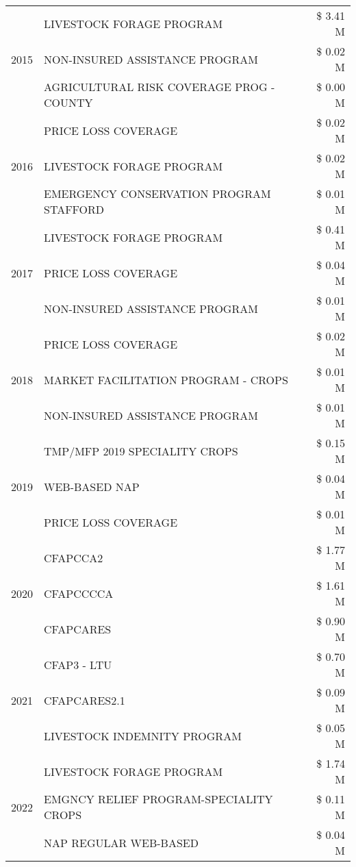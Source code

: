 \begin{tabular}{llr}
\cline{1-3}
\multirow[t]{3}{*}{2015} & LIVESTOCK FORAGE PROGRAM & \$ 3.41 M \\
 & NON-INSURED ASSISTANCE PROGRAM & \$ 0.02 M \\
 & AGRICULTURAL RISK COVERAGE PROG - COUNTY & \$ 0.00 M \\
\cline{1-3}
\multirow[t]{3}{*}{2016} & PRICE LOSS COVERAGE & \$ 0.02 M \\
 & LIVESTOCK FORAGE PROGRAM & \$ 0.02 M \\
 & EMERGENCY CONSERVATION PROGRAM STAFFORD & \$ 0.01 M \\
\cline{1-3}
\multirow[t]{3}{*}{2017} & LIVESTOCK FORAGE PROGRAM & \$ 0.41 M \\
 & PRICE LOSS COVERAGE & \$ 0.04 M \\
 & NON-INSURED ASSISTANCE PROGRAM & \$ 0.01 M \\
\cline{1-3}
\multirow[t]{3}{*}{2018} & PRICE LOSS COVERAGE & \$ 0.02 M \\
 & MARKET FACILITATION PROGRAM - CROPS & \$ 0.01 M \\
 & NON-INSURED ASSISTANCE PROGRAM & \$ 0.01 M \\
\cline{1-3}
\multirow[t]{3}{*}{2019} & TMP/MFP 2019 SPECIALITY CROPS & \$ 0.15 M \\
 & WEB-BASED NAP & \$ 0.04 M \\
 & PRICE LOSS COVERAGE & \$ 0.01 M \\
\cline{1-3}
\multirow[t]{3}{*}{2020} & CFAPCCA2 & \$ 1.77 M \\
 & CFAPCCCCA & \$ 1.61 M \\
 & CFAPCARES & \$ 0.90 M \\
\cline{1-3}
\multirow[t]{3}{*}{2021} & CFAP3 - LTU & \$ 0.70 M \\
 & CFAPCARES2.1 & \$ 0.09 M \\
 & LIVESTOCK INDEMNITY PROGRAM & \$ 0.05 M \\
\cline{1-3}
\multirow[t]{3}{*}{2022} & LIVESTOCK FORAGE PROGRAM & \$ 1.74 M \\
 & EMGNCY RELIEF PROGRAM-SPECIALITY CROPS & \$ 0.11 M \\
 & NAP REGULAR WEB-BASED & \$ 0.04 M \\
\cline{1-3}
\bottomrule
\end{tabular}
